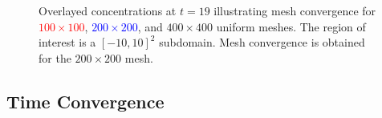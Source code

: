\begin{figure}[hbtp]
\begin{centering}
    \caption[Overlayed concentrations at $t=19$ on illustrating mesh convergence]{Overlayed concentrations at $t=19$ illustrating mesh convergence for \textcolor{red}{$100\times 100$}, \textcolor{blue}{$200\times 200$}, and $400\times 400$ uniform meshes.  The region of interest is a $[-10,10]^2$ subdomain.  Mesh convergence is obtained for the $200\times 200$ mesh.}
  \end{centering}
\end{figure}

\clearpage
\subsection{Time Convergence}
\begin{figure}[hbtp]
  \begin{centering}
     \\

\end{centering}
\end{figure}
